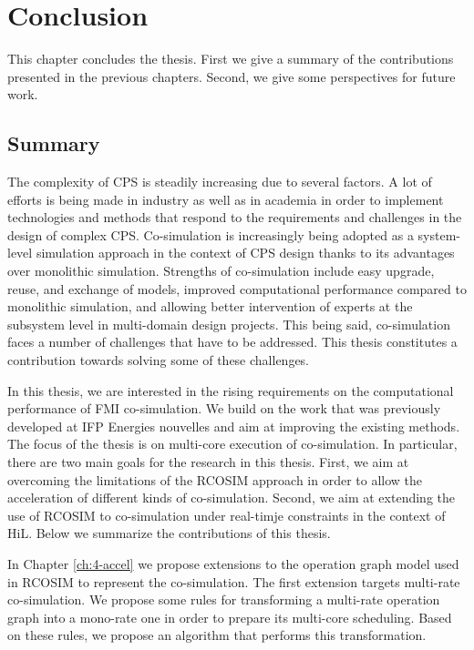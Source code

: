 \chapter{\label{ch:7-concl}Conclusion} 

\minitoc

This chapter concludes the thesis. First we give a summary of the contributions presented in the previous chapters. Second, we give some perspectives for future work.

\section{Summary}

The complexity of CPS is steadily increasing due to several factors. A lot of efforts is being made in industry as well as in academia in order to implement technologies and methods that respond to the requirements and challenges in the design of complex CPS. Co-simulation is increasingly being adopted as a system-level simulation approach in the context of CPS design thanks to its advantages over monolithic simulation. Strengths of co-simulation include easy upgrade, reuse, and exchange of models, improved computational performance compared to monolithic simulation, and allowing better intervention of experts at the subsystem level in multi-domain design projects. This being said, co-simulation faces a number of challenges that have to be addressed. This thesis constitutes a contribution towards solving some of these challenges.   

In this thesis, we are interested in the rising requirements on the computational performance of FMI co-simulation. We build on the work that was previously developed at IFP Energies nouvelles and aim at improving the existing methods. The focus of the thesis is on multi-core execution of co-simulation. In particular, there are two main goals for the research in this thesis. First, we aim at overcoming the limitations of the RCOSIM approach in order to allow the acceleration of different kinds of co-simulation. Second, we aim at extending the use of RCOSIM to co-simulation under real-timje constraints in the context of HiL. Below we summarize the contributions of this thesis.

In Chapter \ref{ch:4-accel} we propose extensions to the operation graph model used in RCOSIM to represent the co-simulation. The first extension targets multi-rate co-simulation. We propose some rules for transforming a multi-rate operation graph into a mono-rate one in order to prepare its multi-core scheduling. Based on these rules, we propose an algorithm that performs this transformation.

